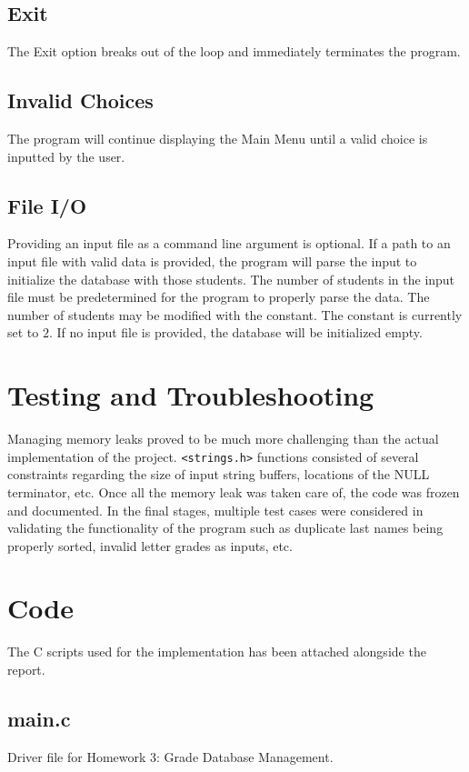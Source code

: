 \documentclass[usletter, 12pt]{article}
\begin{document}
        \subsection{Exit} The Exit option breaks out of the loop and
        immediately terminates the program.

        \subsection{Invalid Choices} The program will continue displaying the
        Main Menu until a valid choice is inputted by the user.

        \subsection{File I/O} Providing an input file as a command line
        argument is optional. If a path to an input file with valid data is
        provided, the program will parse the input to initialize the database
        with those students. The number of students in the input file must be
        predetermined for the program to properly parse the data. The number of
        students may be modified with the  constant.
        The constant is currently set to $2$. If no input file is provided, the
        database will be initialized empty.

    \section{Testing and Troubleshooting} Managing memory leaks proved to be
    much more challenging than the actual implementation of the project.
    \texttt{<strings.h>} functions consisted of several constraints regarding
    the size of input string buffers, locations of the NULL terminator, etc.
    Once all the memory leak was taken care of, the code was frozen and
    documented. In the final stages, multiple test cases were considered in
    validating the functionality of the program such as duplicate last names
    being properly sorted, invalid letter grades as inputs, etc.

    \section{Code} The C scripts used for the implementation has been attached
    alongside the report.

        \subsection{main.c} Driver file for Homework 3: Grade Database
        Management.
\end{document}
